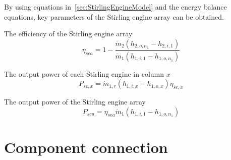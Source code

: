 By using equations in~\ref{sec:StirlingEngineModel} and the energy balance equations, key parameters of the Stirling engine array can be obtained. 

The efficiency of the Stirling engine array \begin{equation}
  \eta_{sea}=1-\dfrac{\dot{m}_{2}(h_{2,o,n_1}-h_{2,i,1})}{\dot{m}_{1}(h_{1,i,1}-h_{1,o,n_1})}
\end{equation}

The output power of each Stirling engine in column $x$
\begin{equation}
  P_{se,x}=\dot{m}_{1,r}(h_{1,i,x}-h_{1,o,x})\eta_{se,x}
\end{equation}

The output power of the Stirling engine array
\begin{equation}
  P_{sea}=\eta_{sea}\dot{m}_{1}(h_{1,i,1}-h_{1,o,n_1})
\end{equation}

\section{Component connection}



